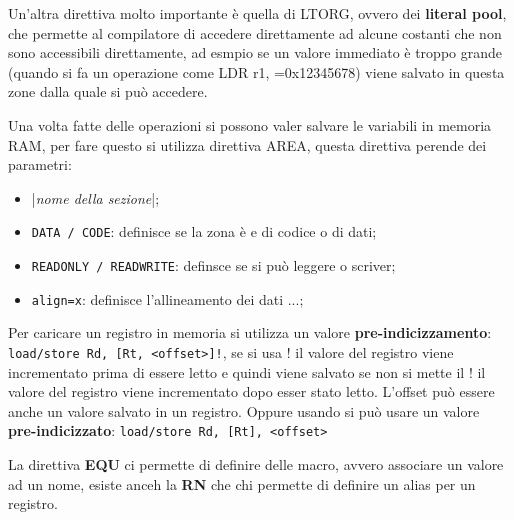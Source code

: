 \documentclass[12pt]{article}
\begin{document}
Un'altra direttiva molto importante \`e quella di LTORG, ovvero dei \textbf{literal pool}, che permette al compilatore di accedere direttamente  ad alcune costanti che non sono accessibili direttamente, ad esmpio se un valore immediato \`e troppo grande (quando si fa un operazione come LDR r1, =0x12345678) viene salvato in questa zone dalla quale si pu\`o accedere.

Una volta fatte delle operazioni si possono valer salvare le variabili in memoria RAM, per fare questo si utilizza direttiva AREA, questa direttiva perende dei parametri:
\begin{itemize}
    \item |\emph{nome della sezione}|;
    \item \texttt{DATA / CODE}: definisce se la zona \`e e di codice o di dati;
    \item \texttt{READONLY / READWRITE}: definsce se si pu\`o leggere o scriver;
    \item \texttt{align=x}: definisce l'allineamento dei dati ...;
\end{itemize}

Per caricare un registro in memoria si utilizza un valore \textbf{pre-indicizzamento}: \texttt{load/store Rd, [Rt, <offset>]{!}}, se si usa ! il valore del registro viene incrementato prima di essere letto e quindi viene salvato se non si mette il ! il valore del registro viene incrementato dopo esser stato letto. L'offset pu\`o essere anche un valore salvato in un registro. Oppure usando si pu\`o usare un valore \textbf{pre-indicizzato}: \texttt{load/store Rd, [Rt], <offset>} 

La direttiva \textbf{EQU} ci permette di definire delle macro, avvero associare un valore ad un nome, esiste anceh la \textbf{RN} che chi permette di definire un alias per un registro.
\end{document}
